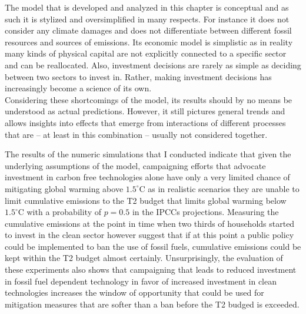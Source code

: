 The model that is developed and analyzed in this chapter is conceptual and as such it is stylized and oversimplified in many respects.
For instance it does not consider any climate damages and does not differentiate between different fossil resources and sources of emissions. Its economic model is simplistic as in reality many kinds of physical capital are not explicitly connected to a specific sector and can be reallocated. Also, investment decisions are rarely as simple as deciding between two sectors to invest in. Rather, making investment decisions has increasingly become a science of its own.\\
Considering these shortcomings of the model, its results should by no means be understood as actual predictions. However, it still pictures general trends and allows insights into effects that emerge from interactions of different processes that are -- at least in this combination -- usually not considered together.

The results of the numeric simulations that I conducted indicate that given the underlying assumptions of the model, campaigning efforts that advocate investment in carbon free technologies alone have only a very limited chance of mitigating global warming above $1.5^{\circ}$C as in realistic scenarios they are unable to limit cumulative emissions to the T2 budget that limits global warming below $1.5^{\circ}$C with a probability of $p=0.5$ in the IPCCs projections.
Measuring the cumulative emissions at the point in time when two thirds of households started to invest in the clean sector however suggest that if at this point a public policy could be implemented to ban the use of fossil fuels, cumulative emissions could be kept within the T2 budget almost certainly. 
Unsurprisingly, the evaluation of these experiments also shows that campaigning that leads to reduced investment in fossil fuel dependent technology in favor of increased investment in clean technologies increases the window of opportunity that could be used for mitigation measures that are softer than a ban before the T2 budged is exceeded.

